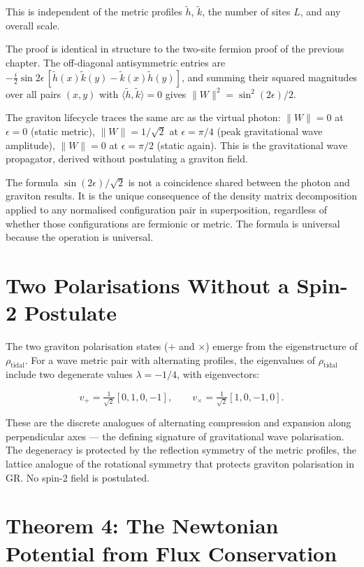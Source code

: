 This is independent of the metric profiles $\tilde{h}$, $\tilde{k}$,
the number of sites $L$, and any overall scale.

The proof is identical in structure to the two-site fermion proof of
the previous chapter. The off-diagonal antisymmetric entries are
$-\tfrac{i}{2}\sin 2\epsilon\,[\tilde{h}(x)\tilde{k}(y) -
\tilde{k}(x)\tilde{h}(y)]$, and summing their squared magnitudes over
all pairs $(x, y)$ with $\langle\tilde{h}, \tilde{k}\rangle = 0$ gives
$\|W\|^2 = \sin^2(2\epsilon)/2$.

The graviton lifecycle traces the same arc as the virtual photon:
$\|W\| = 0$ at $\epsilon = 0$ (static metric), $\|W\| = 1/\sqrt{2}$
at $\epsilon = \pi/4$ (peak gravitational wave amplitude),
$\|W\| = 0$ at $\epsilon = \pi/2$ (static again). This is the
gravitational wave propagator, derived without postulating a graviton
field.

The formula $\sin(2\epsilon)/\sqrt{2}$ is not a coincidence shared
between the photon and graviton results. It is the unique consequence
of the density matrix decomposition applied to any normalised
configuration pair in superposition, regardless of whether those
configurations are fermionic or metric. The formula is universal
because the operation is universal.

\section{Two Polarisations Without a Spin-2 Postulate}

The two graviton polarisation states ($+$ and $\times$) emerge from
the eigenstructure of $\rho_{\mathrm{tidal}}$. For a wave metric pair
with alternating profiles, the eigenvalues of $\rho_{\mathrm{tidal}}$
include two degenerate values $\lambda = -1/4$, with eigenvectors:

\[
v_+ = \tfrac{1}{\sqrt{2}}[0, 1, 0, -1], \qquad
v_\times = \tfrac{1}{\sqrt{2}}[1, 0, -1, 0].
\]

These are the discrete analogues of alternating compression and
expansion along perpendicular axes --- the defining signature of
gravitational wave polarisation. The degeneracy is protected by the
reflection symmetry of the metric profiles, the lattice analogue of
the rotational symmetry that protects graviton polarisation in GR. No
spin-2 field is postulated.

\section{Theorem 4: The Newtonian Potential from Flux Conservation}

